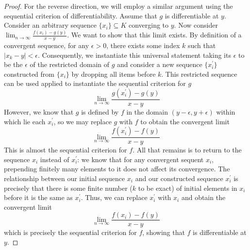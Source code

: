 \documentclass[letterpaper,11pt]{article}
\begin{document}
\begin{enumerate}
\begin{proof}
            For the reverse direction, we will employ a similar argument using
            the sequential criterion of differentiability. Assume that $g$ is
            differentiable at $y$. Consider an arbitrary sequence
            $\{x_i\} \subseteq K$ converging to $y$. Now consider
            $\lim_{n\to\infty}{\frac{f(x_i) - g(y)}{x - y}}$. We want to show
            that this limit exists. By definition of a convergent sequence,
            for any $\epsilon > 0$, there exists some index $k$ such that
            $|x_k - y| < \epsilon$. Consequently, we instantiate this universal
            statement taking its $\epsilon$ to be the $\epsilon$ of the
            restricted domain of $g$ and consider a new sequence
            $\{x_i^\prime\}$ constructed from $\{x_i\}$ by dropping all items
            before $k$. This restricted sequence can be used applied to
            instantiate the sequential criterion for $g$
            \begin{equation*}
                \lim_{n\to\infty}{
                    \frac{g(x_i^\prime) - g(y)}{x - y}
                }
            \end{equation*}
            However, we know that $g$ is defined by $f$ in the domain
            $(y-\epsilon, y+\epsilon)$ within which lie each $x_i^\prime$, so
            we may replace $g$ with $f$ to obtain the convergent limit
            \begin{equation*}
                \lim_{n\to\infty}{
                    \frac{f(x_i^\prime) - f(y)}{x - y}
                }
            \end{equation*}
            This is almost the sequential criterion for $f$. All that remains
            is to return to the sequence $x_i$ instead of $x_i^\prime$: we know
            that for any convergent sequent $x_i$, prepending finitely many
            elements to it does not affect its convergence. The relationship
            between our initial sequence $x_i$ and our constructed sequence
            $x_i^\prime$ is precisely that there is some finite number ($k$ to
            be exact) of initial elements in $x_i$ before it is the same as
            $x_i^\prime$. Thus, we can replace $x_i^\prime$ with $x_i$ and
            obtain the convergent limit
            \begin{equation*}
                \lim_{n\to\infty}{
                    \frac{f(x_i) - f(y)}{x - y}
                }
            \end{equation*}
            which is precisely the sequential criterion for $f$, showing that
            $f$ is differentiable at $y$.
        \end{proof}


\end{enumerate}
\end{document}
